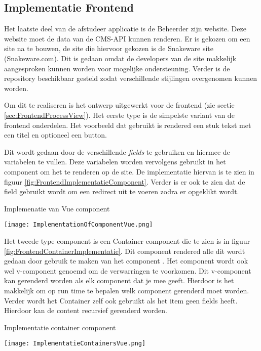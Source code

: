 \subsection{Implementatie Frontend}
Het laatste deel van de afstudeer applicatie is de \gls{Beheerder} zijn website.
Deze website moet de data van de CMS-API kunnen renderen.
Er is gekozen om een site na te bouwen, de site die hiervoor gekozen is de Snakeware site (Snakeware.com).
Dit is gedaan omdat de developers van de site makkelijk aangesproken kunnen worden voor mogelijke ondersteuning.
Verder is de repository beschikbaar gesteld zodat verschillende stijlingen overgenomen kunnen worden.

\whitespace
Om dit te realiseren is het ontwerp uitgewerkt voor de frontend (zie sectie \ref{sec:FrontendProcessView}).
Het eerste type is de simpelste variant van de frontend onderdelen. 
Het voorbeeld dat gebruikt is rendered een stuk tekst met een titel en optioneel een button.

\whitespace
Dit wordt gedaan door de verschillende \textit{fields} te gebruiken en hiermee de variabelen te vullen.
Deze variabelen worden vervolgens gebruikt in het component om het te renderen op de site.
De implementatie hiervan is te zien in figuur \ref{fig:FrontendImplementatieComponent}.
Verder is er ook te zien dat de  field gebruikt wordt om  een redirect uit te voeren zodra er opgeklikt wordt.

\whitespace
\begin{graphic}
    \captionsetup{type=figure}
    \caption{Implemenatie van Vue component}
    \texttt{[image: ImplementationOfComponentVue.png]}
    \label{fig:FrontendImplementatieComponent}
\end{graphic}

\whitespace
Het tweede type component is een Container component die te zien is in figuur \ref{fig:FrontendContainerImplementatie}.
Dit component rendered alle  dit wordt gedaan door gebruik te maken van het component .
Het  component wordt ook wel v-component genoemd om de verwarringen te voorkomen.
Dit v-component kan gerenderd worden als elk component dat je mee geeft.
Hierdoor is het makkelijk om op run time te bepalen welk component gerenderd moet worden.
Verder wordt het Container zelf ook gebruikt als het item geen fields heeft.
Hierdoor kan de content recursief gerenderd worden.

\newpage

\whitespace
\begin{graphic}
    \captionsetup{type=figure}
    \caption{Implementatie container component}
    \texttt{[image: ImplementatieContainersVue.png]}
    \label{fig:FrontendContainerImplementatie}
\end{graphic}


